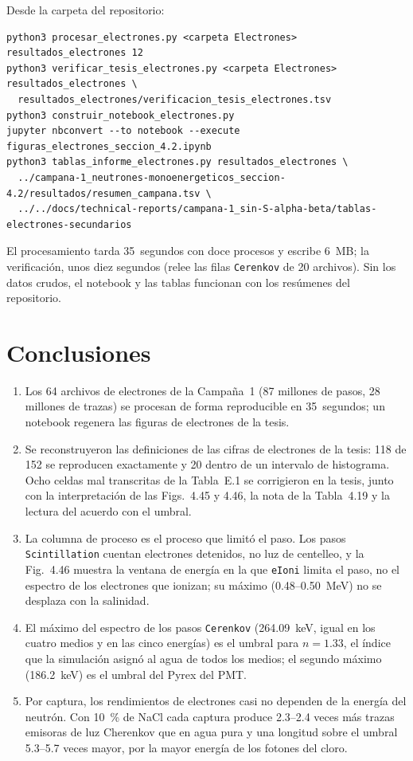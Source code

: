 \documentclass[11pt,a4paper]{article}
\newcommand{\var}[1]{\texttt{#1}}
\begin{document}
Desde la carpeta  del repositorio:
\begin{lstlisting}
python3 procesar_electrones.py <carpeta Electrones> resultados_electrones 12
python3 verificar_tesis_electrones.py <carpeta Electrones> resultados_electrones \
  resultados_electrones/verificacion_tesis_electrones.tsv
python3 construir_notebook_electrones.py
jupyter nbconvert --to notebook --execute figuras_electrones_seccion_4.2.ipynb
python3 tablas_informe_electrones.py resultados_electrones \
  ../campana-1_neutrones-monoenergeticos_seccion-4.2/resultados/resumen_campana.tsv \
  ../../docs/technical-reports/campana-1_sin-S-alpha-beta/tablas-electrones-secundarios
\end{lstlisting}
El procesamiento tarda 35~segundos con doce procesos y escribe 6~MB; la verificación, unos diez segundos (relee las filas \var{Cerenkov} de 20 archivos). Sin los datos crudos, el notebook y las tablas funcionan con los resúmenes del repositorio.

\section{Conclusiones}

\begin{enumerate}
  \item Los 64 archivos de electrones de la Campaña~1 (87 millones de pasos, 28 millones de trazas) se procesan de forma reproducible en 35~segundos; un notebook regenera las figuras de electrones de la tesis.
  \item Se reconstruyeron las definiciones de las cifras de electrones de la tesis: 118 de 152 se reproducen exactamente y 20 dentro de un intervalo de histograma. Ocho celdas mal transcritas de la Tabla~E.1 se corrigieron en la tesis, junto con la interpretación de las Figs.~4.45 y 4.46, la nota de la Tabla~4.19 y la lectura del acuerdo con el umbral.
  \item La columna de proceso es el proceso que limitó el paso. Los pasos \var{Scintillation} cuentan electrones detenidos, no luz de centelleo, y la Fig.~4.46 muestra la ventana de energía en la que \var{eIoni} limita el paso, no el espectro de los electrones que ionizan; su máximo (0.48--0.50~MeV) no se desplaza con la salinidad.
  \item El máximo del espectro de los pasos \var{Cerenkov} (264.09~keV, igual en los cuatro medios y en las cinco energías) es el umbral para $n=1.33$, el índice que la simulación asignó al agua de todos los medios; el segundo máximo (186.2~keV) es el umbral del Pyrex del PMT.
  \item Por captura, los rendimientos de electrones casi no dependen de la energía del neutrón. Con 10~\% de NaCl cada captura produce 2.3--2.4 veces más trazas emisoras de luz Cherenkov que en agua pura y una longitud sobre el umbral 5.3--5.7 veces mayor, por la mayor energía de los fotones del cloro.
\end{enumerate}
\end{document}
